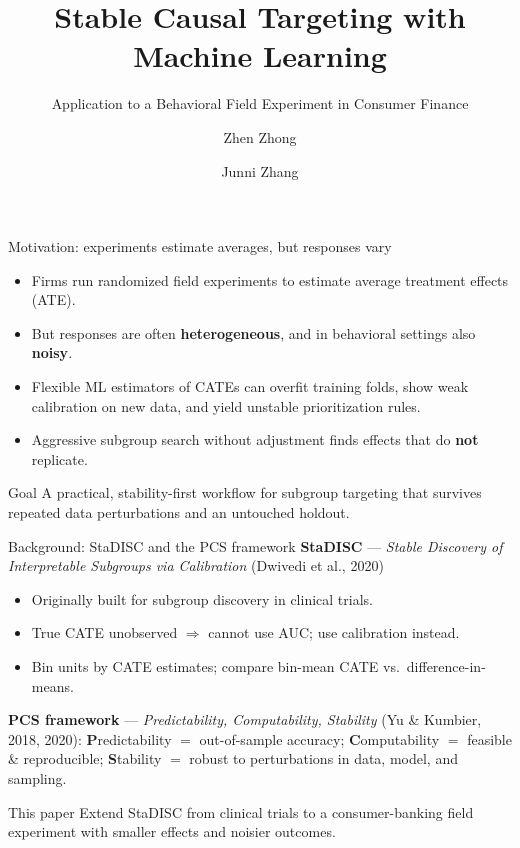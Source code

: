 \documentclass[aspectratio=169,11pt]{beamer}
\title{Stable Causal Targeting with Machine Learning}
\subtitle{Application to a Behavioral Field Experiment in Consumer Finance}
\author{Zhen Zhong\inst{1} \and Junni Zhang\inst{2}}
\institute{\inst{1}TCL Corporate Research \and \inst{2}Peking University}
\date{}
\newcommand{\het}{\textcolor{accent}{\textbf{heterogeneous}}}
\newcommand{\noisy}{\textcolor{warm}{\textbf{noisy}}}
\begin{document}
\maketitle

\begin{frame}{Motivation: experiments estimate averages, but responses vary}
\begin{itemize}
  \item Firms run randomized field experiments to estimate \alert{average treatment effects} (ATE).
  \item But responses are often \het, and in behavioral settings also \noisy.
  \item Flexible ML estimators of CATEs can \alert{overfit} training folds, show \alert{weak calibration} on new data, and yield \alert{unstable} prioritization rules.
  \item Aggressive subgroup search without adjustment finds effects that do \textbf{not} replicate.
\end{itemize}

\vspace{0.2em}
\begin{block}{Goal}
A practical, stability-first workflow for subgroup targeting that survives repeated data perturbations and an untouched holdout.
\end{block}
\end{frame}

\begin{frame}{Background: StaDISC and the PCS framework}
\textbf{StaDISC} — \emph{Stable Discovery of Interpretable Subgroups via Calibration} \small(Dwivedi et al., 2020)\normalsize
\begin{itemize}
  \item Originally built for subgroup discovery in \alert{clinical trials}.
  \item True CATE unobserved $\Rightarrow$ cannot use AUC; use \alert{calibration} instead.
  \item Bin units by CATE estimates; compare bin-mean CATE vs.\ difference-in-means.
\end{itemize}

\vspace{0.1em}
\textbf{PCS framework} — \emph{Predictability, Computability, Stability} \small(Yu \& Kumbier, 2018, 2020)\normalsize:
\textbf{P}redictability $=$ out-of-sample accuracy; \textbf{C}omputability $=$ feasible \& reproducible; \textbf{S}tability $=$ robust to perturbations in data, model, and sampling.

\vspace{0.15em}
\begin{alertblock}{This paper}
Extend StaDISC from clinical trials to a \alert{consumer-banking} field experiment with smaller effects and noisier outcomes.
\end{alertblock}
\end{frame}
\end{document}
